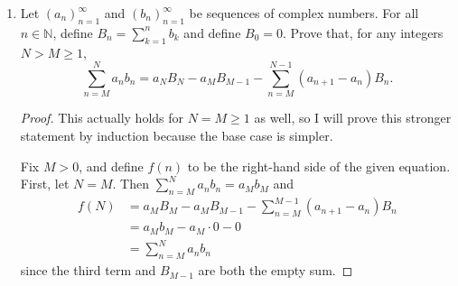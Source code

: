 \documentclass[10pt]{article}
\newcommand{\N}{\mathbb{N}}
\newcommand{\R}{\mathbb{R}}
\newcommand{\C}{\mathbb{C}}
\begin{document}
\begin{enumerate}
\begin{enumerate}
\item $\sum_{n=1}^\infty n! z^{n!}$ \hspace{1cm} $R = 0$
\begin{proof}
Using the same method as in (d), express the series as $\sum_{n=1}^\infty z^{n!} = \sum_{n=1}^\infty na_n z^{n}$, where $a_n$ is defined as before.  For every $M \in \R$, there exists some $N$ such that $k! > M$ for all $k > N$.  Therefore, $\limsup\limits_{n \rightarrow \infty} |n a_n|^{1/n} = \infty$, so $R = 0$.
\end{proof}

\item $\sum_{n=1}^\infty n^n z^{n^2}$ \hspace{1cm} $R = 0$
\begin{proof}
Using the same method, define $a_n = 1$ if $n$ is a perfect square and $a_n = 0$ otherwise.  Thus, $\sum_{n=1}^\infty n^n z^{n^2} = \sum_{n=1}^\infty \sqrt{n}^{\sqrt{n}}a_n z^n$.  Again, $\sqrt{n}^{\sqrt{n}}$ is unbounded and $a_n = 1$ for infinitely many $n$.  Thus $\limsup\limits_{n \rightarrow \infty} |\sqrt{n}^{\sqrt{n}}a_n|^{1/n} = \infty$, so $R = 0$.
\end{proof}
\item $\sum_{n=0}^\infty q^{n^2} z^n$, where $q \in \C$ is such that $|q|<1$. \hspace{1cm} $R = \infty$
\begin{proof}
This is a straightforward application of Hadamard's formula and the fact that the modulus function is multiplicative:
$$
\limsup\limits_{n \rightarrow \infty} |q^{n^2}|^{1/n}
=
\limsup\limits_{n \rightarrow \infty} |q|^n = 0
$$
so $R = \infty$.
\end{proof}
\end{enumerate}

\item Let $(a_n)_{n=1}^\infty$ and $(b_n)_{n=1}^\infty$ be sequences of complex numbers.  For all $n \in \N$, define $B_n = \sum_{k=1}^n b_k$ and define $B_0 = 0$.  Prove that, for any integers $N > M \geq 1$,
$$
\sum_{n=M}^N a_n b_n = a_N B_N - a_M B_{M-1} - \sum_{n=M}^{N-1} (a_{n+1} - a_n)B_n.
$$
\begin{proof}
This actually holds for $N = M \geq 1$ as well, so I will prove this stronger statement by induction because the base case is simpler.

Fix $M > 0$, and define $f(n)$ to be the right-hand side of the given equation.  First, let $N = M$.  Then $\sum_{n=M}^N a_n b_n  = a_M b_M$ and 
\begin{align*}
f(N) &= a_M B_M - a_M B_{M-1} - \sum_{n=M}^{M-1} (a_{n+1} - a_n)B_n
\\
&= a_M b_M - a_M \cdot 0 - 0
\\
&= \sum_{n=M}^N a_n b_n
\end{align*}
since the third term and $B_{M-1}$ are both the empty sum.


\end{proof}
\end{enumerate}
\end{document}

